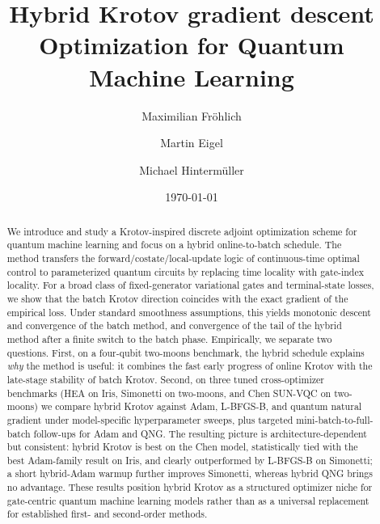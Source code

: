 \documentclass[aps,prb,10pt,twocolumn,superscriptaddress]{revtex4-2}
\begin{document}
\title{Hybrid Krotov gradient descent Optimization for Quantum Machine Learning}


\author{Maximilian Fröhlich}
\author{Martin Eigel}
\author{Michael Hintermüller}

\date{\today}





\begin{abstract}
We introduce and study a Krotov-inspired discrete adjoint optimization scheme for quantum machine learning and focus on a hybrid online-to-batch schedule. The method transfers the forward/costate/local-update logic of continuous-time optimal control to parameterized quantum circuits by replacing time locality with gate-index locality. For a broad class of fixed-generator variational gates and terminal-state losses, we show that the batch Krotov direction coincides with the exact gradient of the empirical loss. Under standard smoothness assumptions, this yields monotonic descent and convergence of the batch method, and convergence of the tail of the hybrid method after a finite switch to the batch phase. Empirically, we separate two questions. First, on a four-qubit two-moons benchmark, the hybrid schedule explains \emph{why} the method is useful: it combines the fast early progress of online Krotov with the late-stage stability of batch Krotov. Second, on three tuned cross-optimizer benchmarks (HEA on Iris, Simonetti on two-moons, and Chen SUN-VQC on two-moons) we compare hybrid Krotov against Adam, L-BFGS-B, and quantum natural gradient under model-specific hyperparameter sweeps, plus targeted mini-batch-to-full-batch follow-ups for Adam and QNG. The resulting picture is architecture-dependent but consistent: hybrid Krotov is best on the Chen model, statistically tied with the best Adam-family result on Iris, and clearly outperformed by L-BFGS-B on Simonetti; a short hybrid-Adam warmup further improves Simonetti, whereas hybrid QNG brings no advantage. These results position hybrid Krotov as a structured optimizer niche for gate-centric quantum machine learning models rather than as a universal replacement for established first- and second-order methods.
\end{abstract}
\end{document}
